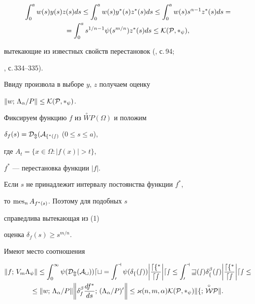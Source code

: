 \begin{pf}
\begin{multline*}
\int_0^aw(s)y(s)z(s)ds \le \int_0^aw(s)y^*(s)z^*(s)ds \le 


\int_0^a w(s)s^{\alpha-1}z^*(s)ds = \\ 


% 


=\int_0^a s^{1/n-1}\psi(s^{m/n})z^*(s)ds \le \cal K(P,\Lambda_\psi), 


\end{multline*} 


вытекающие из известных свойств перестановок (\cite{Kre}, с.\,94; 


\cite{Har}, с.\,334--335). 


Ввиду произвола в выборе $y$, $z$ получаем оценку 


$\|w;\,\Lambda_\alpha/P\|\le\cal K(P,\Lambda_\psi)$. 


 


Фиксируем функцию $f$ из $\overset{\circ}{W}P(\Omega)$ и положим 


$\delta_f(s)=\cal D_m(A_{f^*(s)}$ ($0\le s\le a$), 


где $A_t=\{x\in\Omega:|f(x)|>t\}$, 


$f^*$ --- перестановка функции $|f|$. 


Если $s$ не принадлежит интервалу постоянства функции $f^*$, 


то $\operatorname{mes}_n A_{f^*(s)}$. Поэтому для подобных $s$ 


справедлива вытекающая из (1) 


оценка $\delta_f(s)\ge s^{m/n}$. 


Имеют место соотношения 


\begin{multline*} 


\|f;\,V_m\Lambda_\psi\| \le \int_0^\infty \psi(\cal D_m(A_t))dt= 


\int_0^a \psi(\delta_f(s))\biggl|\frac{df^*}{ds}\biggr|ds \le 


\int_0^a w(s)\delta_f^\beta(s)\biggl|\frac{df^*}{ds}\biggr|ds \le \\ 


% 


\le \|w;\,\Lambda_\alpha/P\|\biggl\|\delta_f^\beta\frac{df^*}{ds};\, 


(\Lambda_\alpha/P)'\biggr\| \le 


\varkappa(n,m,\alpha)\cal K(P,\Lambda_\psi) 


\|f;\,\overset{\circ}{W}P\|. 


\end{multline*} 



\end{pf}
